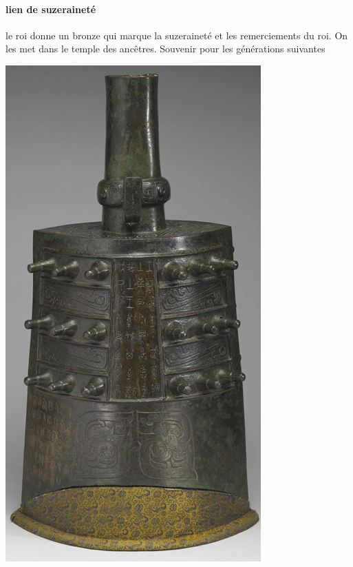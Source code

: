 \paragraph{lien de suzeraineté} le roi donne un bronze qui marque la suzeraineté et les remerciements du roi. On les met dans le temple des ancêtres. Souvenir pour les générations suivantes
\begin{marginfigure}
    \includegraphics[width=\textwidth]{ConfucianismeTaoismeBouddhismeChinois/Images/ZhouBronze.jpg}
\end{marginfigure}
